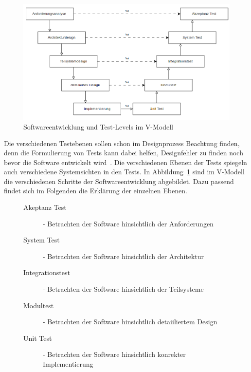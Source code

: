 \begin{figure}[h!]
    \centering
    \includegraphics[width=\textwidth,height=\textheight,keepaspectratio]{img/vmodell}
    \caption{Softwareentwicklung und Test-Levels im V-Modell \cite[vgl. Figure 1.2]{software-testing}}
    \label{vmodelltest}
\end{figure}

Die verschiedenen Testebenen sollen schon im Designprozess Beachtung finden, denn die Formulierung von Tests kann dabei helfen, Designfehler zu finden
noch bevor die Software entwickelt wird~\cite[vgl. 1.1.1]{software-testing-ana}.
Die verschiedenen Ebenen der Tests spiegeln auch verschiedene Systemsichten in den Tests.
In Abbildung~\ref{vmodelltest} sind im V-Modell die verschiedenen Schritte der Softwareentwicklung abgebildet.
Dazu passend findet sich im Folgenden die Erklärung der einzelnen Ebenen.

\newpage
\begin{figure}[h!]
    \begin{description}
        \item[Akeptanz Test] - Betrachten der Software hinsichtlich der Anforderungen
        \item[System Test] - Betrachten der Software hinsichtlich der Architektur
        \item[Integrationstest] - Betrachten der Software hinsichtlich der Teilsysteme
        \item[Modultest] - Betrachten der Software hinsichtlich detaiiliertem Design
        \item[Unit Test] - Betrachten der Software hinsichtlich konrekter Implementierung
    \end{description}\cite[vgl. 1.1.1]{software-testing}
\end{figure}


